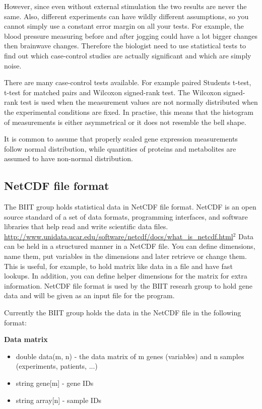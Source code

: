\documentclass[12pt]{article}
\begin{document}
However, since even without external stimulation the two results are never the same. Also, different experiments can have wildly different assumptions, so you cannot simply use a constant error margin on all your tests. For example, the blood pressure measuring before and after jogging could have a lot bigger changes then brainwave changes.  Therefore  the biologist need to use statistical tests to find out which case-control studies are actually significant and which are simply noise.

There are many case-control tests available. For example paired Students t-test, t-test for matched pairs and Wilcoxon signed-rank test. The Wilcoxon signed-rank test is used when the measurement values are not normally distributed when the experimental conditions are fixed.  In practise, this means that the histogram of measurements is either asymmetrical or it does not resemble the bell shape.

It is common to assume that properly scaled gene expression measurements follow normal distribution, while quantities of proteins and metabolites are assumed to have non-normal distribution.

\subsection{NetCDF file format}
The BIIT group holds statistical data in NetCDF file format. NetCDF is an open source standard of a set of data formats, programming interfaces, and software libraries that help read and write scientific data files. \url{http://www.unidata.ucar.edu/software/netcdf/docs/what_is_netcdf.html}$^2$
Data can be held in a structured manner in a NetCDF file. You can define dimensions, name them, put variables in the dimensions and later retrieve or change them. This is useful, for example, to hold matrix like data in a file and have fast lookups. In addition, you can define helper dimensions for the matrix for extra information.
NetCDF file format is used by the BIIT researh group to hold gene data and will be given as an input file for the program.

Currently the BIIT group holds the data in the NetCDF file in the following format:

\textbf{Data matrix}
\begin{itemize}
  \item double data(m, n) - the data matrix of m genes (variables) and n samples (experiments, patients, ...)
  \item string gene[m] - gene IDs
  \item string array[n] - sample IDs
\end{itemize}
\end{document}
